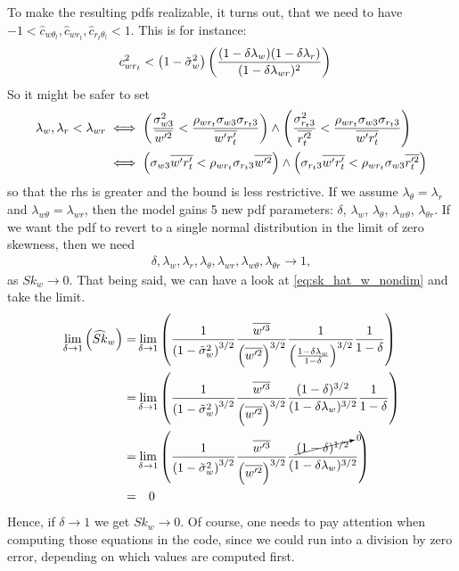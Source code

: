 To make the resulting \glspl{pdf} realizable, it turns out\autocite{larson2022clubbsilhs}, that we need to have
$-1 < \widehat{c}_{w \theta_l}, \widehat{c}_{w r_t}, \widehat{c}_{r_t \theta_l} < 1$.
This is for instance:
\begin{align}
    c_{w r_t}^2 &< \left( 1 - \tilde{\sigma}_w^2 \right) \left(
    \frac{(1-\delta \lambda_w)(1-\delta \lambda_r)}{(1-\delta \lambda_{w r})^2}
    \right)
\end{align}
So it might be safer to set
\begin{align}
    \label{eq:lambda_corr_ineq}
    \lambda_w , \lambda_r < \lambda_{w r}
    &\iff
    \left(\frac{\sigma_{w 3}^2}{\overline{w'^2}} < \frac{\rho_{w r_t} \sigma_{w 3} \sigma_{r_t 3}}{\overline{w' r_t'}}\right)
    \land
    \left(\frac{\sigma_{r_t 3}^2}{\overline{r_t'^2}} < \frac{\rho_{w r_t} \sigma_{w 3} \sigma_{r_t 3}}{\overline{w' r_t'}}\right) \nonumber\\
    &\iff
    \left(\sigma_{w 3} \overline{w' r_t'} < \rho_{w r_t} \sigma_{r_t 3} \overline{w'^2}\right)
    \land
    \left(\sigma_{r_t 3} \overline{w' r_t'} < \rho_{w r_t} \sigma_{w 3} \overline{r_t'^2}\right) \nonumber\\
\end{align}
so that the \gls{rhs} is greater and the bound is less restrictive.
If we assume $\lambda_\theta = \lambda_r$ and $\lambda_{w\theta} = \lambda_{wr}$,
then the model gains 5 new \gls{pdf} parameters:
$\delta$, $\lambda_w$, $\lambda_\theta$, $\lambda_{w \theta}$, $\lambda_{\theta r}$.
If we want the \gls{pdf} to revert to a single normal distribution in the limit of zero skewness,
then we need
\begin{align}
    \delta, \lambda_w, \lambda_r, \lambda_\theta,
    \lambda_{w r}, \lambda_{w \theta}, \lambda_{\theta r}
    \to 1,
\end{align}
as $Sk_w \to 0$.
That being said, we can have a look at \cref{eq:sk_hat_w_nondim} and take the limit.
\begin{align}
    \lim_{\delta \to 1}\left(\widehat{Sk}_w\right)
    =&\lim_{\delta \to 1}
    \left(
    \frac{1}{\left( 1 - \tilde{\sigma}_w^2 \right)^{3/2}}
    \frac{\overline{w'^3}}{\left(\overline{w'^2} \right)^{3/2}}
    \frac{1}{\left(\frac{1-\delta \lambda_w}{1-\delta}\right)^{3/2}}
    \frac{1}{1-\delta}
    \right)
    \nonumber \\
    =&\lim_{\delta \to 1}
    \left(
    \frac{1}{\left( 1 - \tilde{\sigma}_w^2 \right)^{3/2}}
    \frac{\overline{w'^3}}{\left(\overline{w'^2} \right)^{3/2}}
    \frac{(1-\delta)^{3/2}}{(1-\delta \lambda_w)^{3/2}}
    \frac{1}{1-\delta}
    \right)
    \nonumber \\
    =&\lim_{\delta \to 1}
    \left(
    \frac{1}{\left( 1 - \tilde{\sigma}_w^2 \right)^{3/2}}
    \frac{\overline{w'^3}}{\left(\overline{w'^2} \right)^{3/2}}
    \frac{\cancelto{0}{(1-\delta)^{1/2}}}{(1-\delta \lambda_w)^{3/2}}
    \right)
    \nonumber \\
    =& \quad 0
\end{align}
Hence, if $\delta \to 1$ we get $Sk_w \to 0$.
Of course, one needs to pay attention when computing those equations in the code,
since we could run into a division by zero error,
depending on which values are computed first.

